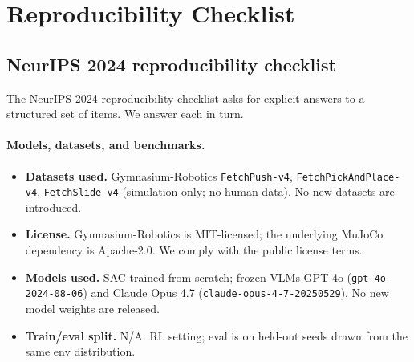 \section{Reproducibility Checklist}
\label{app:repro}

\subsection{NeurIPS 2024 reproducibility checklist}

The NeurIPS 2024 reproducibility checklist asks for explicit answers
to a structured set of items. We answer each in turn.

\paragraph{Models, datasets, and benchmarks.}
\begin{itemize}\itemsep0pt
\item \textbf{Datasets used.} Gymnasium-Robotics \texttt{FetchPush-v4},
\texttt{FetchPickAndPlace-v4}, \texttt{FetchSlide-v4} (simulation only;
no human data). No new datasets are introduced.
\item \textbf{License.} Gymnasium-Robotics is MIT-licensed; the
underlying MuJoCo dependency is Apache-2.0. We comply with the public
license terms.
\item \textbf{Models used.} SAC trained from scratch; frozen VLMs
GPT-4o (\texttt{gpt-4o-2024-08-06}) and Claude Opus 4.7
(\texttt{claude-opus-4-7-20250529}). No new model weights are released.
\item \textbf{Train/eval split.} N/A. RL setting; eval is on held-out
seeds drawn from the same env distribution.
\end{itemize}

